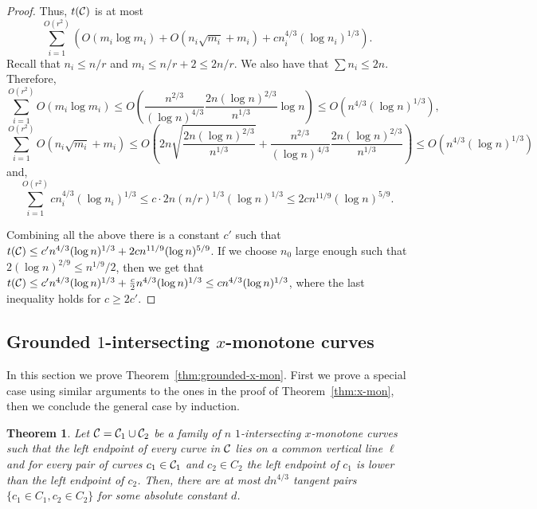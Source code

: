 \documentclass[11pt]{article}
\newtheorem{theorem}{Theorem}
\theoremstyle{definition}
\def\C{{\cal C}}
\begin{document}
\begin{proof}
Thus, $t(\C)$ is at most
\begin{equation}
\sum_{i=1}^{O(r^2)} \left(O(m_i\log m_i) +O(n_i\sqrt{m_i}+m_i) + c n_i^{4/3} (\log n_i)^{1/3}\right).
\end{equation}
Recall that $n_i \le n/r$ and $m_i \le n/r+2 \le 2n/r$.
We also have that $\sum n_i \le 2n$. Therefore, 
\begin{equation}
\sum_{i=1}^{O(r^2)} O(m_i\log m_i) \le O\left(\frac{n^{2/3}}{(\log n)^{4/3}} \frac{2n(\log n)^{2/3}}{n^{1/3}} \log n \right) \le O\left( n^{4/3}(\log n)^{1/3}\right),
\end{equation}
\begin{equation}
	\sum_{i=1}^{O(r^2)} O(n_i\sqrt{m_i}+m_i) \le O\left(2n \sqrt{\frac{2n(\log n)^{2/3}}{n^{1/3}}} + \frac{n^{2/3}}{(\log n)^{4/3}} \frac{2n(\log n)^{2/3}}{n^{1/3}} \right) \le O\left(n^{4/3}(\log n)^{1/3}\right)
\end{equation}
and,
\begin{equation}
	\sum_{i=1}^{O(r^2)} cn_i^{4/3}(\log n_i)^{1/3} \le c\cdot 2n(n/r)^{1/3} (\log n)^{1/3} 
	\le 2c n^{11/9} (\log n)^{5/9}.
\end{equation}

Combining all the above there is a constant $c'$ such that $t(\C) \le c'n^{4/3} (\log n)^{1/3} + 2c n^{11/9} (\log n)^{5/9}$.
If we choose $n_0$ large enough such that $2(\log n)^{2/9} \le n^{1/9}/2$, then we get that
$t(\C) \le c'n^{4/3} (\log n)^{1/3} + \frac{c}{2} n^{4/3} (\log n)^{1/3} \le cn^{4/3} (\log n)^{1/3}$, where the last inequality holds for $c \ge 2c'$.
\end{proof}

\subsection{Grounded $1$-intersecting $x$-monotone curves}
\label{sec:grounded-mon}

In this section we prove Theorem~\ref{thm:grounded-x-mon}.
First we prove a special case using similar arguments to the ones in the proof of Theorem~\ref{thm:x-mon}, then we conclude the general case by induction.

\begin{theorem}\label{thm:red-blue-x-mono-grounded}
	Let $\C = \C_1 \cup \C_2$ be a family of $n$ $1$-intersecting $x$-monotone curves such that the left endpoint of every curve in $\C$ lies on a common vertical line $\ell$ and for every pair of curves $c_1 \in \C_1$ and $c_2 \in C_2$ the left endpoint of $c_1$ is lower than the left endpoint of $c_2$.
	Then, there are at most $d n^{4/3}$ tangent pairs $\{c_1 \in C_1, c_2 \in C_2\}$ for some absolute constant $d$.
\end{theorem}
\end{document}
